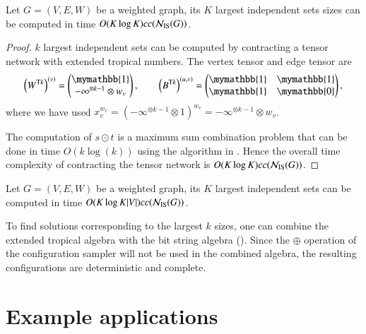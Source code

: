 \documentclass[review, onefignum, onetabnum]{siamart190516}
\begin{document}
\begin{theorem}
    Let $G = (V, E, W)$ be a weighted graph, its $K$ largest independent sets sizes can be computed in time $O(K\log K)cc({\mathcal{N}_{\rm IS}(G)})$.
\end{theorem}
\begin{proof}
$k$ largest independent sets can be computed by contracting a tensor network with extended tropical numbers. The vertex tensor and edge tensor are
\begin{equation}
    \left(W^{{\rm T}k}\right)^{(v)} = \left(\begin{matrix}
        \mymathbb{1} \\
        -\infty^{\otimes k-1} \otimes w_v
    \end{matrix}\right),   
    \qquad
        \left(B^{{\rm T}k}\right)^{(u, v)} = \left(\begin{matrix}
        \mymathbb{1}  & \mymathbb{1} \\
        \mymathbb{1} & \mymathbb{0}
    \end{matrix}\right),
\end{equation}
where we have used $x_v^{w_v} = (-\infty^{\otimes k-1} \otimes 1)^{w_v} = -\infty^{\otimes k-1} \otimes w_v$.

The computation of $s \odot t$ is a maximum sum combination problem that can be done in time $O(k\log(k))$ using the algorithm in . Hence the overall time complexity of contracting the tensor network is $O(K\log K)cc({\mathcal{N}_{\rm IS}(G)})$.
\end{proof}

\begin{lemma}
    Let $G = (V, E, W)$ be a weighted graph, its $K$ largest independent sets can be computed in time $O(K\log K|V|)cc({\mathcal{N}_{\rm IS}(G)})$.
\end{lemma}
To find solutions corresponding to the largest $k$ sizes, one can combine the extended tropical algebra with the bit string algebra ().
Since the $\oplus$ operation of the configuration sampler will not be used in the combined algebra, the resulting configurations are deterministic and complete.

\section{Example applications} \label{sec:examples}
\end{document}
